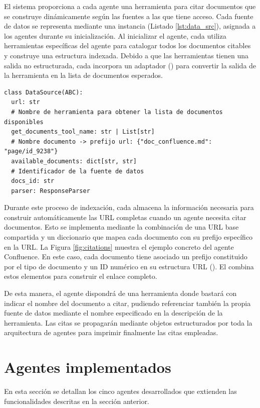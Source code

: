 El sistema proporciona a cada agente una herramienta para citar documentos que se construye dinámicamente según las fuentes a las que tiene acceso. Cada fuente de datos se representa mediante una instancia  (Listado \ref{lst:data_src}), asignada a los agentes durante su inicialización. Al inicializar el agente, cada  utiliza herramientas específicas del agente para catalogar todos los documentos citables y construye una estructura indexada. Debido a que las herramientas tienen una salida no estructurada, cada  incorpora un adaptador () para convertir la salida de la herramienta en la lista de documentos esperados.

\begin{lstlisting}[caption={\protect\opus{DataSource}: clase destinada a almacenar los documentos citables para una fuente de datos}, label={lst:data_src}]
  class DataSource(ABC):
  url: str
  # Nombre de herramienta para obtener la lista de documentos disponibles
  get_documents_tool_name: str | List[str]
  # Nombre documento -> prefijo url: {"doc_confluence.md": "page/id_9238"}
  available_documents: dict[str, str]
  # Identificador de la fuente de datos
  docs_id: str
  parser: ResponseParser
\end{lstlisting}

Durante este proceso de indexación, cada  almacena la información necesaria para construir automáticamente las URL completas cuando un agente necesita citar documentos. Esto se implementa mediante la combinación de una URL base compartida y un diccionario que mapea cada documento con su prefijo específico en la URL. La Figura \ref{fig:citations} muestra el ejemplo concreto del agente Confluence. En este caso, cada documento tiene asociado un prefijo constituido por el tipo de documento y un ID numérico en su estructura URL (). El  combina estos elementos para construir el enlace completo.

De esta manera, el agente dispondrá de una herramienta donde bastará con indicar el nombre del documento a citar, pudiendo referenciar también la propia fuente de datos mediante el nombre especificado en la descripción de la herramienta. Las citas se propagarán mediante objetos estructurados por toda la arquitectura de agentes para imprimir finalmente las citas empleadas.

\section{Agentes implementados}
En esta sección se detallan los cinco agentes desarrollados que extienden las funcionalidades descritas en la sección anterior.

